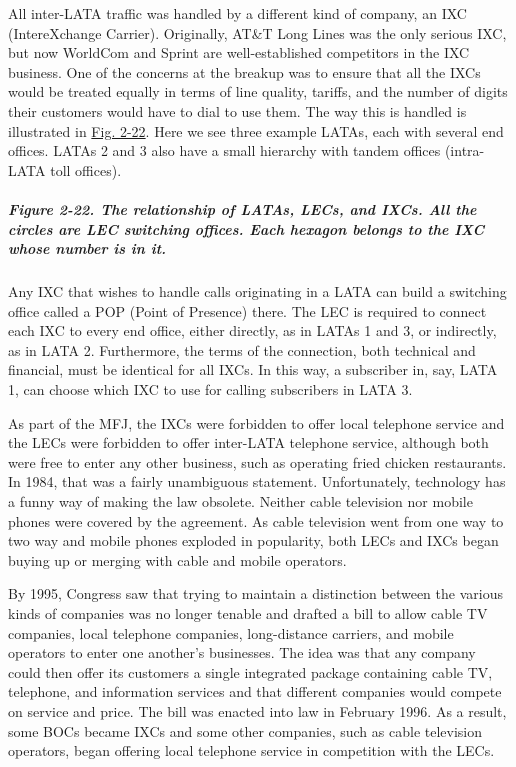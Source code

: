 \documentclass[b5paper,11pt]{memoir}
\begin{document}
All inter-LATA traffic was handled by a different kind of company, an
{IXC} ({IntereXchange Carrier}). Originally, AT\&T Long Lines was the
only serious IXC, but now WorldCom and Sprint are well-established
competitors in the IXC business. One of the concerns at the breakup was
to ensure that all the IXCs would be treated equally in terms of line
quality, tariffs, and the number of digits their customers would have to
dial to use them. The way this is handled is illustrated in
\protect\hyperlink{0130661023_ch02lev1sec5.htmlux5cux23ch02fig22}{Fig.
2-22}. Here we see three example LATAs, each with several end offices.
LATAs 2 and 3 also have a small hierarchy with tandem offices
(intra-LATA toll offices).

\subparagraph[Figure 2-22. The relationship of LATAs, LECs, and IXCs.
All the circles are LEC switching offices. Each hexagon belongs to the
IXC whose number is in
it.]{\texorpdfstring{\protect\hypertarget{0130661023_ch02lev1sec5.htmlux5cux23ch02fig22}{}{}Figure
2-22. The relationship of LATAs, LECs, and IXCs. All the circles are LEC
switching offices. Each hexagon belongs to the IXC whose number is in
it.}{Figure 2-22. The relationship of LATAs, LECs, and IXCs. All the circles are LEC switching offices. Each hexagon belongs to the IXC whose number is in it.}}


Any IXC that wishes to handle calls originating in a LATA can build a
switching office called a {POP} ({Point of Presence}) there. The LEC is
required to connect each IXC to every end office, either directly, as in
LATAs 1 and 3, or indirectly, as in LATA 2. Furthermore, the terms of
the connection, both technical and financial, must be identical for all
IXCs. In this way, a subscriber in, say, LATA 1, can choose which IXC to
use for calling subscribers in LATA 3.

As part of the MFJ, the IXCs were forbidden to offer local telephone
service and the LECs were forbidden to offer inter-LATA telephone
service, although both were free to enter any other business, such as
operating fried chicken restaurants. In 1984, that was a fairly
unambiguous statement. Unfortunately, technology has a funny way of
making the law obsolete. Neither cable television nor mobile phones were
covered by the agreement. As cable television went from one way to two
way and mobile phones exploded in popularity, both LECs and IXCs began
buying up or merging with cable and mobile operators.

By 1995, Congress saw that trying to maintain a distinction between the
various kinds of companies was no longer tenable and drafted a bill to
allow cable TV companies, local telephone companies, long-distance
carriers, and mobile operators to enter one another's businesses. The
idea was that any company could then offer its customers a single
integrated package containing cable TV, telephone, and information
services and that different companies would compete on service and
price. The bill was enacted into law in February 1996. As a result, some
BOCs became IXCs and some other companies, such as cable television
operators, began offering local telephone service in competition with
the LECs.
\end{document}
